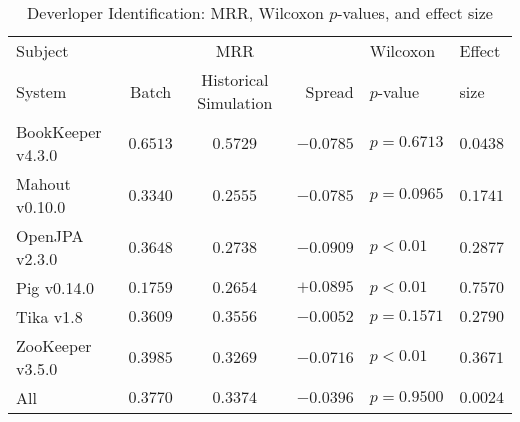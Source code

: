 \begin{table}[t]
\centering
\caption{Deverloper Identification: MRR, Wilcoxon $p$-values, and effect size}
\begin{tabular}{l|ccr|ll}
\toprule
Subject & & MRR & & Wilcoxon & Effect \\
System  &  Batch & Historical Simulation & Spread & $p$-value & size \\
\midrule
BookKeeper v4.3.0 & $\bm{0.6513}$ & $0.5729$ & $-0.0785$ & $p = 0.6713$ & $0.0438$ \\
Mahout v0.10.0 & $\bm{0.3340}$ & $0.2555$ & $-0.0785$ & $p = 0.0965$ & $0.1741$ \\
OpenJPA v2.3.0 & $\bm{0.3648}$ & $0.2738$ & $-0.0909$ & $p < 0.01$ & $0.2877$ \\
Pig v0.14.0 & $0.1759$ & $\bm{0.2654}$ & $+0.0895$ & $p < 0.01$ & $0.7570$ \\
Tika v1.8 & $\bm{0.3609}$ & $0.3556$ & $-0.0052$ & $p = 0.1571$ & $0.2790$ \\
ZooKeeper v3.5.0 & $\bm{0.3985}$ & $0.3269$ & $-0.0716$ & $p < 0.01$ & $0.3671$ \\
\midrule
All & $\bm{0.3770}$ & $0.3374$ & $-0.0396$ & $p = 0.9500$ & $0.0024$ \\
\bottomrule
\end{tabular}
\label{table:triage_rq2}
\end{table}
